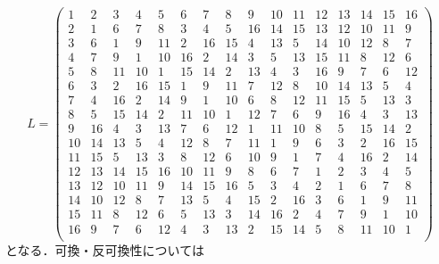 \[L =
\begin{pmatrix}
  1 & 2 & 3 & 4 & 5 & 6 & 7 & 8 & 9 & 10 & 11 & 12 & 13 & 14 & 15 & 16 \\
  2 & 1 & 6 & 7 & 8 & 3 & 4 & 5 & 16 & 14 & 15 & 13 & 12 & 10 & 11 & 9 \\
  3 & 6 & 1 & 9 & 11 & 2 & 16 & 15 & 4 & 13 & 5 & 14 & 10 & 12 & 8 & 7 \\
  4 & 7 & 9 & 1 & 10 & 16 & 2 & 14 & 3 & 5 & 13 & 15 & 11 & 8 & 12 & 6 \\
  5 & 8 & 11 & 10 & 1 & 15 & 14 & 2 & 13 & 4 & 3 & 16 & 9 & 7 & 6 & 12 \\
  6 & 3 & 2 & 16 & 15 & 1 & 9 & 11 & 7 & 12 & 8 & 10 & 14 & 13 & 5 & 4 \\
  7 & 4 & 16 & 2 & 14 & 9 & 1 & 10 & 6 & 8 & 12 & 11 & 15 & 5 & 13 & 3 \\
  8 & 5 & 15 & 14 & 2 & 11 & 10 & 1 & 12 & 7 & 6 & 9 & 16 & 4 & 3 & 13 \\
  9 & 16 & 4 & 3 & 13 & 7 & 6 & 12 & 1 & 11 & 10 & 8 & 5 & 15 & 14 & 2 \\
  10 & 14 & 13 & 5 & 4 & 12 & 8 & 7 & 11 & 1 & 9 & 6 & 3 & 2 & 16 & 15 \\
  11 & 15 & 5 & 13 & 3 & 8 & 12 & 6 & 10 & 9 & 1 & 7 & 4 & 16 & 2 & 14 \\
  12 & 13 & 14 & 15 & 16 & 10 & 11 & 9 & 8 & 6 & 7 & 1 & 2 & 3 & 4 & 5 \\
  13 & 12 & 10 & 11 & 9 & 14 & 15 & 16 & 5 & 3 & 4 & 2 & 1 & 6 & 7 & 8 \\
  14 & 10 & 12 & 8 & 7 & 13 & 5 & 4 & 15 & 2 & 16 & 3 & 6 & 1 & 9 & 11 \\
  15 & 11 & 8 & 12 & 6 & 5 & 13 & 3 & 14 & 16 & 2 & 4 & 7 & 9 & 1 & 10 \\
  16 & 9 & 7 & 6 & 12 & 4 & 3 & 13 & 2 & 15 & 14 & 5 & 8 & 11 & 10 & 1 \\
\end{pmatrix}
\]
となる．可換・反可換性については
